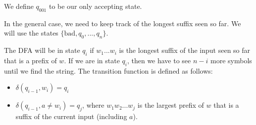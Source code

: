 \documentclass[11pt,a4paper]{article}
\begin{document}
We define $q_{001}$ to be our only accepting state.

In the general case, we need to keep track of the longest suffix seen so far. We will use the states $\{\text{bad},q_0,...,q_n\}$.

The DFA will be in state $q_i$ if $w_1...w_i$ is the longest suffix of the input seen so far that is a prefix of $w$.
If we are in state $q_i$, then we have to see $n-i$ more symbols until we find the string.
The transition function is defined as follows:

\begin{itemize}
    \item $\delta(q_{i-1},w_i)=q_i$
    \item $\delta(q_{i-1},a\neq w_i)=q_j$, where $w_1w_2...w_j$ is the largest prefix of $w$ that is a suffix of the current input (including $a$).
\end{itemize}
\end{document}
